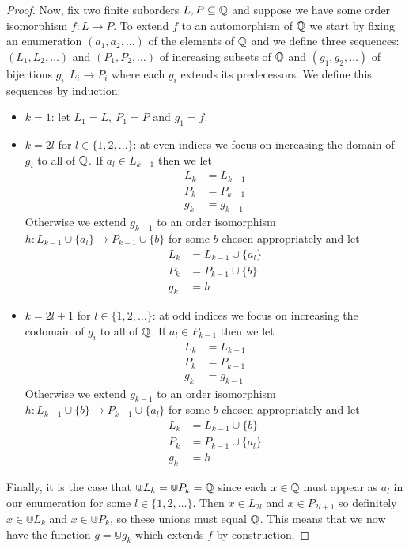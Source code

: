 \begin{proof}
  Now, fix two finite suborders $L,P \subseteq \mathbb{Q}$
  and suppose we have some order isomorphism $f : L \to P$. To extend $f$ to an automorphism of $\mathbb{Q}$
  we start by fixing an enumeration $(a_1, a_2, \dots)$ of the elements of $\mathbb{Q}$ and we define
  three sequences: $(L_1, L_2, \dots)$ and $(P_1, P_2, \dots)$ of increasing subsets of $\mathbb{Q}$ and
  $(g_1, g_2, \dots)$ of bijections $g_i : L_i \to P_i$ where each $g_i$ extends its predecessors.
  We define this sequences by induction:
  \begin{itemize}
    \item $k = 1$: let $L_1 = L,\ P_1 = P$ and $g_1 = f$.
    \item $k = 2l$ for $l \in \{1, 2, \dots\}$: at even indices we focus on increasing the domain of
      $g_i$ to all of $\mathbb{Q}$. If $a_l \in L_{k-1}$ then we let
      \begin{align*}
        L_k & = L_{k-1} \\
        P_k & = P_{k-1} \\
        g_k & = g_{k-1}
      \end{align*}
      Otherwise we extend $g_{k-1}$ to an order isomorphism
      $h : L_{k-1} \cup \{a_l\} \to P_{k-1} \cup \{b\}$ for some $b$ chosen appropriately and let
      \begin{align*}
        L_k & = L_{k-1} \cup \{a_l\} \\
        P_k & = P_{k-1} \cup \{b\} \\
        g_k & = h
      \end{align*}
    \item $k = 2l + 1$ for $l \in \{1, 2, \dots\}$: at odd indices we focus on increasing the
      codomain of $g_i$ to all of $\mathbb{Q}$. If $a_l \in P_{k-1}$ then we let
      \begin{align*}
        L_k & = L_{k-1} \\
        P_k & = P_{k-1} \\
        g_k & = g_{k-1}
      \end{align*}
      Otherwise we extend $g_{k-1}$ to an order isomorphism
      $h : L_{k-1} \cup \{b\} \to P_{k-1} \cup \{a_l\}$ for some $b$ chosen appropriately and let
      \begin{align*}
        L_k & = L_{k-1} \cup \{b\} \\
        P_k & = P_{k-1} \cup \{a_l\} \\
        g_k & = h
      \end{align*}
  \end{itemize}
  Finally, it is the case that $\Cup L_k = \Cup P_k = \mathbb{Q}$ since each $x \in \mathbb{Q}$ must appear as $a_l$
  in our enumeration for some $l \in \{1, 2, \dots\}$. Then $x \in L_{2l}$ and $x \in P_{2l+1}$ so
  definitely $x \in \Cup L_k$ and $x \in \Cup P_k$, so these unions must equal $\mathbb{Q}$. This means that
  we now have the function $g = \Cup g_k$ which extends $f$ by construction.
\end{proof}

